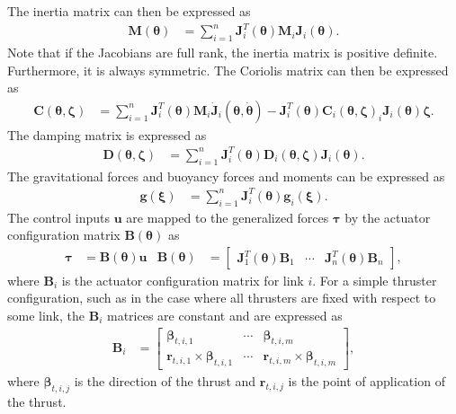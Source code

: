 The inertia matrix
can then be expressed as
\begin{align}
    \bm{M}(\bm{\theta}) &= \sum_{i=1}^{n} \bm{J}_{i}^T(\bm{\theta}) \bm{M}_i \bm{J}_{i}(\bm{\theta}).
\end{align}
Note that if the Jacobians are full rank, the inertia matrix is positive definite.
Furthermore, it is always symmetric. The Coriolis matrix can then be expressed as
\begin{align}
    \bm{C}(\bm{\theta}, \bm{\zeta}) &=
    \sum_{i=1}^{n} \bm{J}_{i}^T(\bm{\theta}) \bm{M}_i \dot{\bm{J}}_{i}(\bm{\theta},\dot{\bm{\theta}})
    -\bm{J}_{i}^T(\bm{\theta}) \bm{C}_i(\bm{\theta},\bm{\zeta})_i \bm{J}_{i}(\bm{\theta}) \bm{\zeta}.
\end{align}
The damping matrix is expressed as
\begin{align}
    \bm{D}(\bm{\theta}, \bm{\zeta}) &=
    \sum_{i=1}^{n} \bm{J}_{i}^T(\bm{\theta}) \bm{D}_i(\bm{\theta},\bm{\zeta}) \bm{J}_{i}(\bm{\theta}).
\end{align}
The gravitational forces and buoyancy forces and moments can be expressed as
\begin{align}
    \bm{g}(\bm{\xi}) &=
    \sum_{i=1}^{n} \bm{J}_{i}^T(\bm{\theta}) \bm{g}_i(\bm{\xi}). \label{eq:modeling:g}
\end{align}
The control inputs $\bm{u}$ are mapped to the generalized forces $\bm{\tau}$ by
the actuator configuration matrix $\bm{B}(\bm{\theta})$ as
\begin{align}
    \bm{\tau} &= \bm{B}(\bm{\theta}) \bm{u} &
    \bm{B}(\bm{\theta}) &= \begin{bmatrix}
        \bm{J}_1^T(\bm{\theta}) \bm{B}_1 & \cdots & \bm{J}_n^T(\bm{\theta}) \bm{B}_n
    \end{bmatrix},
\end{align}
where $\bm{B}_i$ is the actuator configuration matrix for link $i$. For a simple
thruster configuration, such as in the case where all thrusters are fixed with
respect to some link, the $\bm{B}_i$ matrices are constant and are expressed
as
\begin{align}
    \bm{B}_i &= \begin{bmatrix}
        \bm{\beta}_{t,i,1} & \cdots & \bm{\beta}_{t,i,m} \\
        \bm{r}_{t,i,1} \times \bm{\beta}_{t,i,1} & \cdots & \bm{r}_{t,i,m} \times \bm{\beta}_{t,i,m}
    \end{bmatrix},
\end{align}
where $\bm{\beta}_{t,i,j}$ is the direction of the thrust and $\bm{r}_{t,i,j}$
is the point of application of the thrust.





